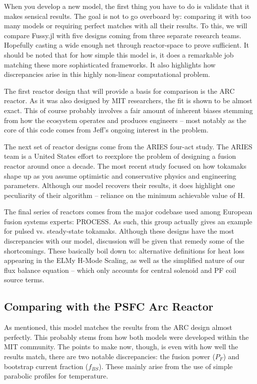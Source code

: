 When you develop a new model, the first thing you have to do is validate that it makes sensical results. The goal is not to go overboard by: comparing it with too many models or requiring perfect matches with all their results. To this, we will compare Fussy.jl with five designs coming from three separate research teams. Hopefully casting a wide enough net through reactor-space to prove sufficient. It should be noted that for how simple this model is, it does a remarkable job matching these more sophisticated frameworks. It also highlights how discrepancies arise in this highly non-linear computational problem.

The first reactor design that will provide a basis for comparison is the ARC reactor. As it was also designed by MIT researchers, the fit is shown to be almost exact. This of course probably involves a fair amount of inherent biases stemming from how the ecosystem operates and produces engineers -- most notably as the core of this code comes from Jeff's ongoing interest in the problem.

The next set of reactor designs come from the ARIES four-act study. The ARIES team is a United States effort to reexplore the problem of designing a fusion reactor around once a decade. The most recent study focused on how tokamaks shape up as you assume optimistic and conservative physics and engineering parameters. Although our model recovers their results, it does highlight one peculiarity of their algorithm -- reliance on the minimum achievable value of H.

The final series of reactors comes from the major codebase used among European fusion systems experts: PROCESS. As such, this group actually gives an example for pulsed vs. steady-state tokamaks. Although these designs have the most discrepancies with our model, discussion will be given that remedy some of the shortcomings. These basically boil down to: alternative definitions for heat loss appearing in the ELMy H-Mode Scaling, as well as the simplified nature of our flux balance equation -- which only accounts for central solenoid and PF coil source terms. 

\newpage 

\subsection{Comparing with the PSFC Arc Reactor}

As mentioned, this model matches the results from the ARC design almost perfectly. This probably stems from how both models were developed within the MIT community.  The points to make now, though, is even with how well the results match, there are two notable discrepancies: the fusion power ($P_F$) and bootstrap current fraction ($f_{BS}$). These mainly arise from the use of simple parabolic profiles for temperature.

